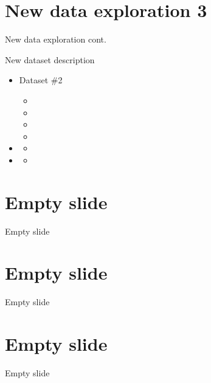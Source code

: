 \documentclass[10pt,xcolor={table,dvipsnames},t]{beamer}
\begin{document}
\section{New data exploration 3}
\begin{frame}{New data exploration cont.}

New dataset description

    \begin{itemize}
        \item Dataset \#2
            \begin{itemize}
                \item 
                \item 
                \item 
                \item 
            \end{itemize}
        \item 
            \begin{itemize}
                \item 
            \end{itemize}
        \item
            \begin{itemize}
                \item
            \end{itemize}
    \end{itemize}
    
\end{frame}
\section{Empty slide}
\begin{frame}{Empty slide}

    
\end{frame}
\section{Empty slide}
\begin{frame}{Empty slide}

    
\end{frame}
\section{Empty slide}
\begin{frame}{Empty slide}

    
\end{frame}
\end{document}

